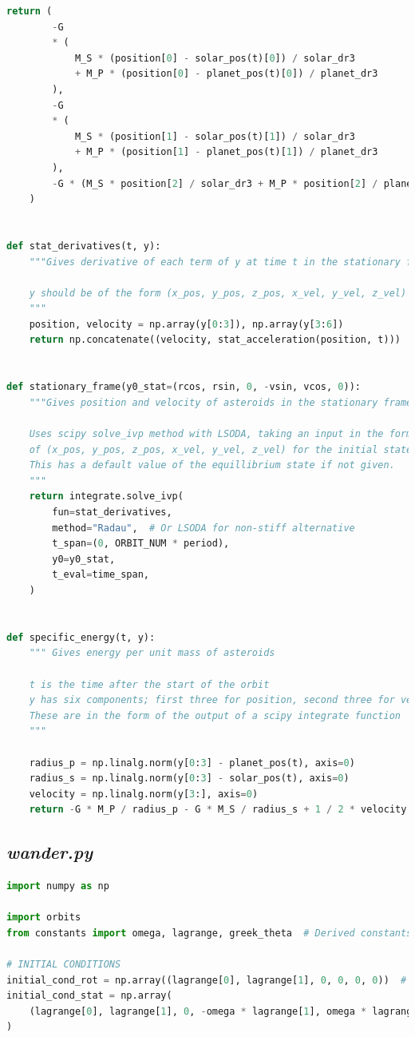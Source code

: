 \documentclass[11pt, a4paper,twocolumn]{article} %
\begin{document}
\begin{appendices}
\begin{lstlisting}[language=Python]
	return (
		-G
		* (
			M_S * (position[0] - solar_pos(t)[0]) / solar_dr3
			+ M_P * (position[0] - planet_pos(t)[0]) / planet_dr3
		),
		-G
		* (
			M_S * (position[1] - solar_pos(t)[1]) / solar_dr3
			+ M_P * (position[1] - planet_pos(t)[1]) / planet_dr3
		),
		-G * (M_S * position[2] / solar_dr3 + M_P * position[2] / planet_dr3),
	)


def stat_derivatives(t, y):
	"""Gives derivative of each term of y at time t in the stationary frame
	
	y should be of the form (x_pos, y_pos, z_pos, x_vel, y_vel, z_vel)
	"""
	position, velocity = np.array(y[0:3]), np.array(y[3:6])
	return np.concatenate((velocity, stat_acceleration(position, t)))


def stationary_frame(y0_stat=(rcos, rsin, 0, -vsin, vcos, 0)):
	"""Gives position and velocity of asteroids in the stationary frame
	
	Uses scipy solve_ivp method with LSODA, taking an input in the form
	of (x_pos, y_pos, z_pos, x_vel, y_vel, z_vel) for the initial state.
	This has a default value of the equillibrium state if not given.
	"""
	return integrate.solve_ivp(
		fun=stat_derivatives,
		method="Radau",  # Or LSODA for non-stiff alternative
		t_span=(0, ORBIT_NUM * period),
		y0=y0_stat,
		t_eval=time_span,
	)


def specific_energy(t, y):
	""" Gives energy per unit mass of asteroids
	
	t is the time after the start of the orbit
	y has six components; first three for position, second three for velocity
	These are in the form of the output of a scipy integrate function
	"""
	
	radius_p = np.linalg.norm(y[0:3] - planet_pos(t), axis=0)
	radius_s = np.linalg.norm(y[0:3] - solar_pos(t), axis=0)
	velocity = np.linalg.norm(y[3:], axis=0)
	return -G * M_P / radius_p - G * M_S / radius_s + 1 / 2 * velocity ** 2

\end{lstlisting}
\bigskip

\subsection{\textit{wander.py}}
\begin{lstlisting}[language=Python]
import numpy as np

import orbits
from constants import omega, lagrange, greek_theta  # Derived constants

# INITIAL CONDITIONS
initial_cond_rot = np.array((lagrange[0], lagrange[1], 0, 0, 0, 0))  # in rotating frame
initial_cond_stat = np.array(
	(lagrange[0], lagrange[1], 0, -omega * lagrange[1], omega * lagrange[0], 0)
)


\end{lstlisting}
\end{appendices}
\end{document}
